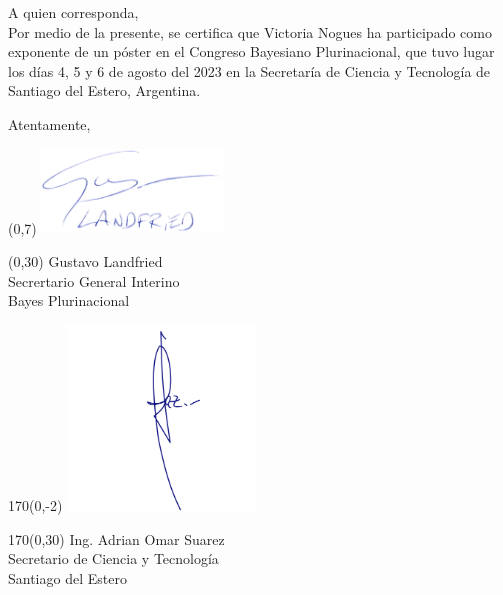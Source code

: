 \documentclass[a4paper,11pt]{letter}
\begin{document}
\begin{letter}
\noindent A quien corresponda, \\ [0.3cm]

\hspace{1cm} Por medio de la presente, se certifica que Victoria Nogues ha participado como exponente de un póster en el Congreso Bayesiano Plurinacional, que tuvo lugar los días 4, 5 y 6 de agosto del 2023 en la Secretaría de Ciencia y Tecnología de Santiago del Estero, Argentina.

Atentamente,

\vspace{1.3cm}

\begin{textblock}{80}(0,7)
\phantom{.} \hfill \includegraphics[width=4.8cm]{firma.png}\hspace{2cm}\phantom{.} \\[0cm]
\end{textblock}
\begin{textblock}{80}(0,30)
 \phantom{.} \hfill Gustavo Landfried \hspace{2.5cm}\phantom{.}\\ \small
\phantom{.} \hfill Secrertario General Interino \hspace{2.5cm}\phantom{.}\\
\phantom{.} \hfill Bayes Plurinacional \hspace{2.5cm}\phantom{.}\\
\end{textblock}

\begin{textblock}{170}(0,-2)
\phantom{.} \hfill \includegraphics[width=5cm]{secretarioCyT.png}\hspace{2cm}\phantom{.} \\[-2cm]
\end{textblock}
\begin{textblock}{170}(0,30)
 \phantom{.} \hfill Ing. Adrian Omar Suarez \hspace{2.5cm}\phantom{.}\\ \small
\phantom{.} \hfill Secretario de Ciencia y Tecnología \hspace{2.5cm}\phantom{.}\\
\phantom{.} \hfill Santiago del Estero \hspace{2.5cm}\phantom{.}\\
\end{textblock}



\end{letter}
\end{document}
